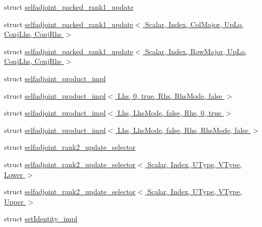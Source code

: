 \begin{DoxyCompactItemize}
\item 
struct \hyperlink{struct_eigen_1_1internal_1_1selfadjoint__packed__rank1__update}{selfadjoint\+\_\+packed\+\_\+rank1\+\_\+update}
\item 
struct \hyperlink{struct_eigen_1_1internal_1_1selfadjoint__packed__rank1__update_3_01_scalar_00_01_index_00_01_col211b56a6e7dbb087a746c109f1fd6193}{selfadjoint\+\_\+packed\+\_\+rank1\+\_\+update$<$ Scalar, Index, Col\+Major, Up\+Lo, Conj\+Lhs, Conj\+Rhs $>$}
\item 
struct \hyperlink{struct_eigen_1_1internal_1_1selfadjoint__packed__rank1__update_3_01_scalar_00_01_index_00_01_row44ee905dfbb7f4c0a9e13e624ea4a89c}{selfadjoint\+\_\+packed\+\_\+rank1\+\_\+update$<$ Scalar, Index, Row\+Major, Up\+Lo, Conj\+Lhs, Conj\+Rhs $>$}
\item 
struct \hyperlink{struct_eigen_1_1internal_1_1selfadjoint__product__impl}{selfadjoint\+\_\+product\+\_\+impl}
\item 
struct \hyperlink{struct_eigen_1_1internal_1_1selfadjoint__product__impl_3_01_lhs_00_010_00_01true_00_01_rhs_00_01_rhs_mode_00_01false_01_4}{selfadjoint\+\_\+product\+\_\+impl$<$ Lhs, 0, true, Rhs, Rhs\+Mode, false $>$}
\item 
struct \hyperlink{struct_eigen_1_1internal_1_1selfadjoint__product__impl_3_01_lhs_00_01_lhs_mode_00_01false_00_01_rhs_00_010_00_01true_01_4}{selfadjoint\+\_\+product\+\_\+impl$<$ Lhs, Lhs\+Mode, false, Rhs, 0, true $>$}
\item 
struct \hyperlink{struct_eigen_1_1internal_1_1selfadjoint__product__impl_3_01_lhs_00_01_lhs_mode_00_01false_00_01_0e7941e7b3bc2131c413f23ec856f76c}{selfadjoint\+\_\+product\+\_\+impl$<$ Lhs, Lhs\+Mode, false, Rhs, Rhs\+Mode, false $>$}
\item 
struct \hyperlink{struct_eigen_1_1internal_1_1selfadjoint__rank2__update__selector}{selfadjoint\+\_\+rank2\+\_\+update\+\_\+selector}
\item 
struct \hyperlink{struct_eigen_1_1internal_1_1selfadjoint__rank2__update__selector_3_01_scalar_00_01_index_00_01_uf491e100c52e514fc778fd2dd4e730f2}{selfadjoint\+\_\+rank2\+\_\+update\+\_\+selector$<$ Scalar, Index, U\+Type, V\+Type, Lower $>$}
\item 
struct \hyperlink{struct_eigen_1_1internal_1_1selfadjoint__rank2__update__selector_3_01_scalar_00_01_index_00_01_uf7a068ce7ab78b9bb81bd0ca858e99d2}{selfadjoint\+\_\+rank2\+\_\+update\+\_\+selector$<$ Scalar, Index, U\+Type, V\+Type, Upper $>$}
\item 
struct \hyperlink{struct_eigen_1_1internal_1_1set_identity__impl}{set\+Identity\+\_\+impl}

\end{DoxyCompactItemize}
